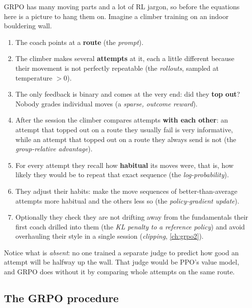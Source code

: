 GRPO has many moving parts and a lot of RL jargon, so before the equations here is a
picture to hang them on. Imagine a climber training on an indoor bouldering wall.
\begin{enumerate}
\item The coach points at a \textbf{route} (the \emph{prompt}).
\item The climber makes several \textbf{attempts} at it, each a little different because
their movement is not perfectly repeatable (the \emph{rollouts}, sampled at temperature
$>0$).
\item The only feedback is binary and comes at the very end: did they \textbf{top out}?
Nobody grades individual moves (a \emph{sparse, outcome reward}).
\item After the session the climber compares attempts \textbf{with each other}: an
attempt that topped out on a route they usually fail is very informative, while an
attempt that topped out on a route they always send is not (the \emph{group-relative
advantage}).
\item For every attempt they recall how \textbf{habitual} its moves were, that is, how
likely they would be to repeat that exact sequence (the \emph{log-probability}).
\item They adjust their habits: make the move sequences of better-than-average attempts
more habitual and the others less so (the \emph{policy-gradient update}).
\item Optionally they check they are not drifting away from the fundamentals their
first coach drilled into them (the \emph{KL penalty to a reference policy}) and avoid
overhauling their style in a single session (\emph{clipping}, \cref{ch:grpo2}).
\end{enumerate}
Notice what is \emph{absent}: no one trained a separate judge to predict how good an
attempt will be halfway up the wall. That judge would be PPO's value model, and GRPO does
without it by comparing whole attempts on the same route.

\subsection{The GRPO procedure}\label{sec:grpo:procedure}

